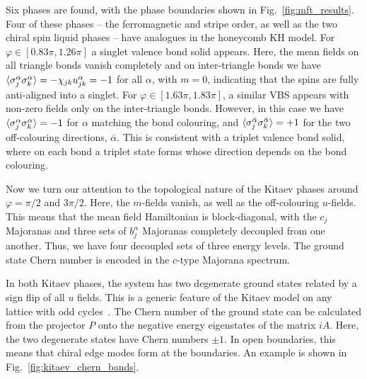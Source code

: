 Six phases are found, with the phase boundaries shown in Fig.~\ref{fig:mft_results}. Four of these phases -- the ferromagnetic and stripe order, as well as the two chiral spin liquid phases -- have analogues in the honeycomb KH model. For $\varphi \in [0.83\pi, 1.26\pi]$ a singlet valence bond solid appears. Here, the mean fields on all triangle bonds vanish completely and on inter-triangle bonds we have $\braket{\sigma^\alpha_j \sigma_k^\alpha} = -\chi_{jk} u^\alpha_{jk} = -1$ for all $\alpha$, with $m = 0$, indicating that the spins are fully anti-aligned into a singlet. For  $\varphi \in [1.63\pi, 1.83\pi]$, a similar VBS appears with non-zero fields only on the inter-triangle bonds. However, in this case we have $\braket{\sigma^\alpha_j \sigma_k^\alpha} = -1$ for $\alpha$ matching the bond colouring, and $\braket{\sigma^{\bar \alpha}_j \sigma_k^{\bar \alpha}} = +1$ for the two off-colouring directions, ${\bar \alpha}$. This is consistent with a triplet valence bond solid, where on each bond a triplet state forms whose direction depends on the bond colouring. 

Now we turn our attention to the topological nature of the Kitaev phases around $\varphi = \pi/2$ and $ 3\pi/2$. Here, the $m$-fields vanish, as well as the off-colouring $u$-fields. This means that the mean field Hamiltonian is block-diagonal, with the $c_j$ Majoranas and three sets of $b_j^\alpha$ Majoranas completely decoupled from one another. Thus, we have four decoupled sets of three energy levels. The ground state Chern number is encoded in the $c$-type Majorana spectrum. 

In both Kitaev phases, the system has two degenerate ground states related by a sign flip of all $u$ fields. This is a generic feature of the Kitaev model on any lattice with odd cycles~\cite{yao_exact_2007}. The Chern number of the ground state can be calculated from the projector $P$ onto the negative energy eigenstates of the matrix $iA$. Here, the two degenerate states have Chern numbers $\pm 1$. In open boundaries, this means that chiral edge modes form at the boundaries. An example is shown in Fig.~\ref{fig:kitaev_chern_bands}.

